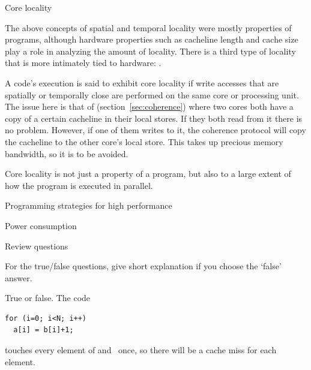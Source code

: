  {Core locality}

The above concepts of spatial and temporal locality were mostly
properties of programs, although hardware properties such as cacheline
length and cache size play a role in analyzing the amount of
locality. There is a third type of locality that is more intimately
tied to hardware: .

A code's execution is said to exhibit core locality if write accesses
that are spatially or temporally close are performed on the same core
or processing unit. The issue here is that of
 (section~\ref{sec:coherence}) where two
cores both have a copy of a certain cacheline in their local stores.
If they both read from it there is no problem. However, if one of them
writes to it, the coherence protocol will copy the cacheline to the
other core's local store. This takes up precious memory bandwidth, so
it is to be avoided.

Core locality is not just a property of a program, but also to a large
extent of how
the program is executed in parallel.

 {Programming strategies for high performance}
\label{sec:performance-programming}


 {Power consumption}
\label{sec:power}


 {Review questions}

For the true/false questions, give short explanation if you choose the `false' answer.

\begin{exercise}
  True or false. The code
\begin{verbatim}
for (i=0; i<N; i++)
  a[i] = b[i]+1;
\end{verbatim}
touches every element of  and~ once, so there will be a cache miss
for each element.
\end{exercise}

